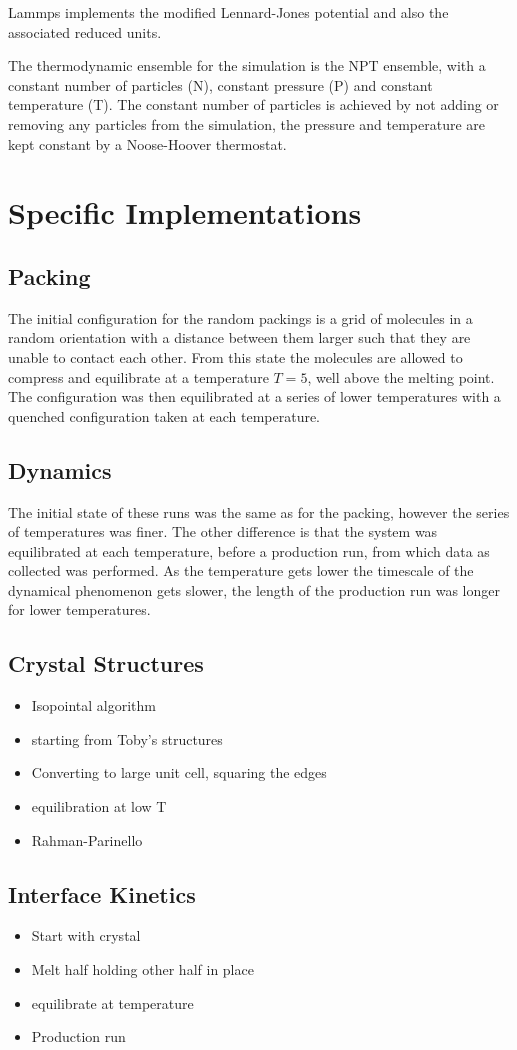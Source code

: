 Lammps implements the modified Lennard-Jones potential and also the associated reduced units.

The thermodynamic ensemble for the simulation is the NPT ensemble, with a constant number of particles (N), constant pressure (P) and constant temperature (T). The constant number of particles is achieved by not adding or removing any particles from the simulation, the pressure and temperature are kept constant by a Noose-Hoover thermostat\tocheck.


\section{Specific Implementations}

\subsection{Packing}

The initial configuration for the random packings is a grid of molecules in a random orientation with a distance between them larger such that they are unable to contact each other. From this state the molecules are allowed to compress and equilibrate at a temperature $T=5$, well above the melting point. The configuration was then equilibrated at a series of lower temperatures with a quenched configuration taken at each temperature.

\subsection{Dynamics}

The initial state of these runs was the same as for the packing, however the series of temperatures was finer. The other difference is that the system was equilibrated at each temperature, before a production run, from which data as collected was performed. As the temperature gets lower the timescale of the dynamical phenomenon gets slower, the length of the production run was longer for lower temperatures.

\subsection{Crystal Structures}

\begin{itemize}
    \item Isopointal algorithm
    \item starting from Toby's structures
    \item Converting to large unit cell, squaring the edges
    \item equilibration at low T
    \item Rahman-Parinello
\end{itemize}

\subsection{Interface Kinetics}

\begin{itemize}
    \item Start with crystal
    \item Melt half holding other half in place
    \item equilibrate at temperature
    \item Production run
\end{itemize}


